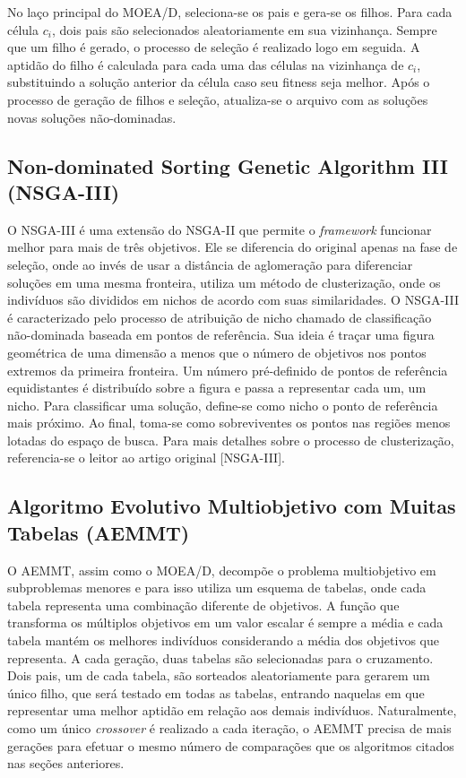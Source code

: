 No laço principal do MOEA/D, seleciona-se os pais e gera-se os filhos. Para cada célula $c_i$, dois pais são selecionados aleatoriamente em sua vizinhança. Sempre que um filho é gerado, o processo de seleção é realizado logo em seguida. A aptidão do filho é calculada para cada uma das células na vizinhança de $c_i$, substituindo a solução anterior da célula caso seu fitness seja melhor. Após o processo de geração de filhos e seleção, atualiza-se o arquivo com as soluções novas soluções não-dominadas.

\subsection{Non-dominated Sorting Genetic Algorithm III (NSGA-III)}

O NSGA-III é uma extensão do NSGA-II que permite o \textit{framework} funcionar melhor para mais de três objetivos. Ele se diferencia do original apenas na fase de seleção, onde ao invés de usar a distância de aglomeração para diferenciar soluções em uma mesma fronteira, utiliza um método de clusterização, onde os indivíduos são divididos em nichos de acordo com suas similaridades. O NSGA-III é caracterizado pelo processo de atribuição de nicho chamado de classificação não-dominada baseada em pontos de referência. Sua ideia é traçar uma figura geométrica de uma dimensão a menos que o número de objetivos nos pontos extremos da primeira fronteira. Um número pré-definido de pontos de referência equidistantes é distribuído sobre a figura e passa a representar cada um, um nicho. Para classificar uma solução, define-se como nicho o ponto de referência mais próximo. Ao final, toma-se como sobreviventes os pontos nas regiões menos lotadas do espaço de busca. Para mais detalhes sobre o processo de clusterização, referencia-se o leitor ao artigo original [NSGA-III].

\subsection{Algoritmo Evolutivo Multiobjetivo com Muitas Tabelas (AEMMT)}

O AEMMT, assim como o MOEA/D, decompõe o problema multiobjetivo em subproblemas menores e para isso utiliza um esquema de tabelas, onde cada tabela representa uma combinação diferente de objetivos. A função que transforma os múltiplos objetivos em um valor escalar é sempre a média e cada tabela mantém os melhores indivíduos considerando a média dos objetivos que representa. A cada geração, duas tabelas são selecionadas para o cruzamento. Dois pais, um de cada tabela, são sorteados aleatoriamente para gerarem um único filho, que será testado em todas as tabelas, entrando naquelas em que representar uma melhor aptidão em relação aos demais indivíduos. Naturalmente, como um único \textit{crossover} é realizado a cada iteração, o AEMMT precisa de mais gerações para efetuar o mesmo número de comparações que os algoritmos citados nas seções anteriores.

